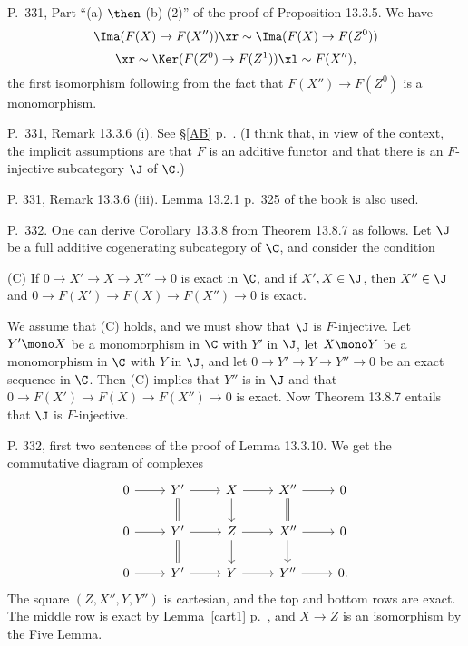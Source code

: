\documentclass[12pt]{article}
\theoremstyle{remark}
\theoremstyle{definition}
\begin{document}
%

\begin{s}
P.~331, Part ``(a) $\then$ (b) (2)'' of the proof of Proposition 13.3.5. We have 
$$
\Ima(F(X)\to F(X''))\xr\sim\Ima(F(X)\to F(Z^0))
$$
$$
\xr\sim\Ker(F(Z^0)\to F(Z^1))\xl\sim F(X''),
$$ 
the first isomorphism following from the fact that $F(X'')\to F(Z^0)$ is a monomorphism.
\end{s}

%

\begin{s}
P.~331, Remark 13.3.6 (i). See \S\ref{AB} p.~. (I think that, in view of the context, the implicit assumptions are that $F$ is an additive functor and that there is an $F$-injective subcategory $\J$ of $\C$.) 
\end{s}

%

\begin{s}
P. 331, Remark 13.3.6 (iii). Lemma 13.2.1 p.~325 of the book is also used.
\end{s}

%

\begin{s}
P.~332. One can derive Corollary 13.3.8 from Theorem 13.8.7 as follows. Let $\J$ be a full additive cogenerating subcategory of $\C$, and consider the condition

\nn(C) If $0\to X'\to X\to X''\to0$ is exact in $\C$, and if $X',X\in\J$, then $X''\in\J$ and $0\to F(X')\to F(X)\to F(X'')\to0$ is exact.

We assume that (C) holds, and we must show that $\J$ is $F$-injective. Let $Y'\mono X$ be a monomorphism in $\C$ with $Y'$ in $\J$, let $X\mono Y$ be a monomorphism in $\C$ with $Y$ in $\J$, and let $0\to Y'\to Y\to Y''\to0$ be an exact sequence in $\C$. Then (C) implies that $Y''$ is in $\J$ and that $0\to F(X')\to F(X)\to F(X'')\to0$ is exact. Now Theorem 13.8.7 entails that $\J$ is $F$-injective.
\end{s}

%

\begin{s}
P. 332, first two sentences of the proof of Lemma 13.3.10. We get the commutative diagram of complexes 
$$
\begin{tikzcd}
0\ar[r]&Y'\ar[d,equal]\ar[r]&X\ar[d]\ar[r]&X''\ar[d,equal]\ar[r]&0\\ 
0\ar[r]&Y'\ar[d,equal]\ar[r]&Z\ar[d]\ar[r]&X''\ar[d]      \ar[r]&0\\ 
0\ar[r]&Y'            \ar[r]&Y      \ar[r]&Y''            \ar[r]&0.
\end{tikzcd} 
$$ 
The square $(Z,X'',Y,Y'')$ is cartesian, and the top and bottom rows are exact. The middle row is exact by Lemma~\ref{cart1} p.~, and $X\to Z$ is an isomorphism by the Five Lemma.
\end{s}
\end{document}
